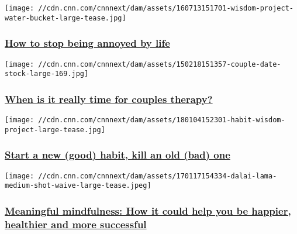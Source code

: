 \texttt{[image: //cdn.cnn.com/cnnnext/dam/assets/160713151701-wisdom-project-water-bucket-large-tease.jpg]}

\hypertarget{how-to-stop-being-annoyed-by-life}{%
\subsubsection{\texorpdfstring{\href{/2016/07/14/health/stop-being-annoyed-wisdom-project/index.html}{How
to stop being annoyed by
life}}{How to stop being annoyed by life}}\label{how-to-stop-being-annoyed-by-life}}

\href{/2017/07/26/health/couple-therapy-kerner/index.html}{}

\texttt{[image: //cdn.cnn.com/cnnnext/dam/assets/150218151357-couple-date-stock-large-169.jpg]}

\hypertarget{when-is-it-really-time-for-couples-therapy}{%
\subsubsection{\texorpdfstring{\href{/2017/07/26/health/couple-therapy-kerner/index.html}{When
is it really time for couples
therapy?}}{When is it really time for couples therapy?}}\label{when-is-it-really-time-for-couples-therapy}}

\href{/2018/01/05/health/habits-wisdom-project/index.html}{}

\texttt{[image: //cdn.cnn.com/cnnnext/dam/assets/180104152301-habit-wisdom-project-large-tease.jpg]}

\hypertarget{start-a-new-good-habit-kill-an-old-bad-one}{%
\subsubsection{\texorpdfstring{\href{/2018/01/05/health/habits-wisdom-project/index.html}{Start
a new (good) habit, kill an old (bad)
one}}{Start a new (good) habit, kill an old (bad) one}}\label{start-a-new-good-habit-kill-an-old-bad-one}}

\href{/2017/02/15/health/mindfulness-meditation-techniques/index.html}{}

\texttt{[image: //cdn.cnn.com/cnnnext/dam/assets/170117154334-dalai-lama-medium-shot-waive-large-tease.jpeg]}

\hypertarget{meaningful-mindfulness-how-it-could-help-you-be-happier-healthier-and-more-successful}{%
\subsubsection{\texorpdfstring{\href{/2017/02/15/health/mindfulness-meditation-techniques/index.html}{Meaningful
mindfulness: How it could help you be happier, healthier and more
successful}}{Meaningful mindfulness: How it could help you be happier, healthier and more successful}}\label{meaningful-mindfulness-how-it-could-help-you-be-happier-healthier-and-more-successful}}

